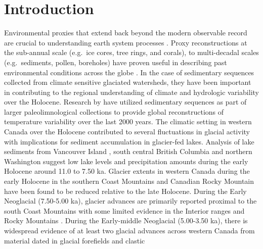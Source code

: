 \documentclass[Royal,times,doublespace,sageh]{sagej}
\begin{document}

\maketitle

\hypertarget{introduction}{%
\section{Introduction}\label{introduction}}

Environmental proxies that extend back beyond the modern observable
record are crucial to understanding earth system processes
\citep{Turney2019, Huber2012, Nelson2016}. Proxy reconstructions at the
sub-annual scale (e.g.~ice cores, tree rings, and corals), to
multi-decadal scales (e.g.~sediments, pollen, boreholes) have proven
useful in describing past environmental conditions across the globe
\citep{Masson2013}. In the case of sedimentary sequences collected from
climate sensitive glaciated watersheds, they have been important in
contributing to the regional understanding of climate and hydrologic
variability over the Holocene. Research by \citet{Neukom2019} have
utilized sedimentary sequences as part of larger paleolimnological
collections to provide global reconstructions of temperature variability
over the last 2000 years. The climatic setting in western Canada over
the Holocene contributed to several fluctuations in glacial activity
with implications for sediment accumulation in glacier-fed lakes.
Analysis of lake sediments from Vancouver Island \citep{Brown2006},
south central British Columbia \citep{Lowe1997} and northern Washington
\citep{Steinman2019} suggest low lake levels and precipitation amounts
during the early Holocene around 11.0 to 7.50 ka. Glacier extents in
western Canada during the early Holocene in the southern Coast Mountains
\citep{Menounos2004, Koch2007a, Osborn2007} and Canadian Rocky Mountain
\citep{Luckman1988, Luckman1988, Luckman1993} have been found to be
reduced relative to the late Holocene. During the Early Neoglacial
(7.50-5.00 ka), glacier advances are primarily reported proximal to the
south Coast Mountains \citep{Osborn2007, Filippelli2006, Ryder1986} with
some limited evidence in the Interior ranges and Rocky Mountains
\citep{Luckman1993}. During the Early-middle Neoglacial (5.00-3.50 ka),
there is widespread evidence of at least two glacial advances across
western Canada from material dated in glacial forefields and clastic
\end{document}
